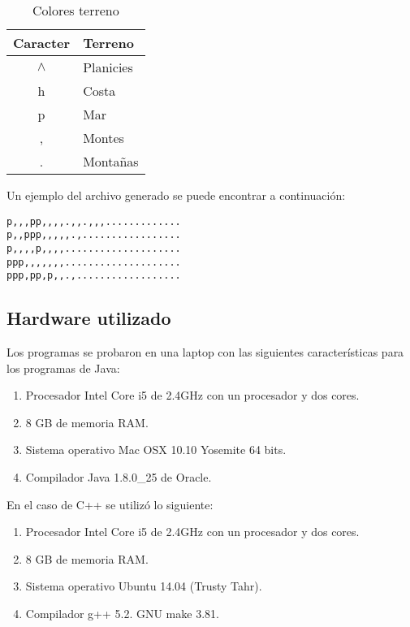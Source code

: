 \documentclass[10pt,letterpaper,oneside]{article}
\begin{document}
\begin{table}[H]
	\centering
	\begin{tabular}{|c|l|}
		\hline
			Caracter & Terreno		\\
		\hline
			$\wedge$& Planicies 		\\
			h		& Costa			\\
			p		& Mar			\\
			,		& Montes			\\
			. 		& Montañas		\\
		\hline
	\end{tabular}
	\caption{Colores terreno}
	\label{tab:maptext}
\end{table}

\pagebreak

Un ejemplo del archivo generado se puede encontrar a continuación:

\begin{verbatim}
p,,,pp,,,,.,,.,,,.............
p,,ppp,,,,,.,.................
p,,,,p,,,,....................
ppp,,,,,,,....................
ppp,pp,p,,.,..................
\end{verbatim}

\subsection{Hardware utilizado}

Los programas se probaron en una laptop con las siguientes características para los programas de Java:

\begin{enumerate}
	\item Procesador Intel Core i5 de 2.4GHz con un procesador y dos cores.
	\item 8 GB de memoria RAM.
	\item Sistema operativo Mac OSX 10.10 Yosemite 64 bits.
	\item Compilador Java 1.8.0\_25 de Oracle.
\end{enumerate}

En el caso de C++ se utilizó lo siguiente:

\begin{enumerate}
	\item Procesador Intel Core i5 de 2.4GHz con un procesador y dos cores.
	\item 8 GB de memoria RAM.
	\item Sistema operativo Ubuntu 14.04 (Trusty Tahr).
	\item Compilador g++ 5.2. GNU make 3.81.
\end{enumerate}
\end{document}

